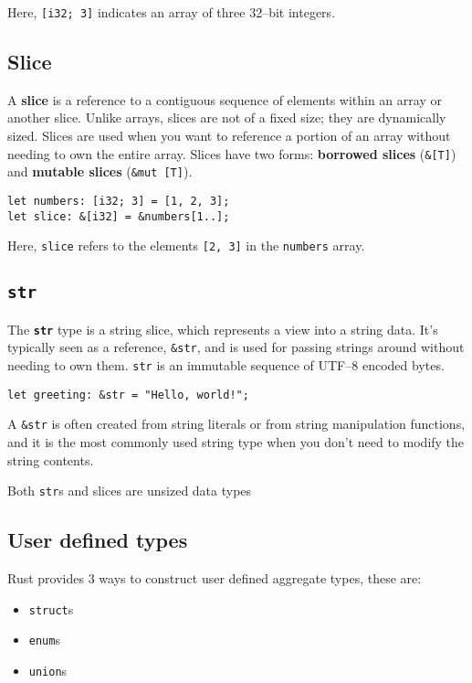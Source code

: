 Here, \texttt{[i32; 3]} indicates an array of three 32--bit integers.

\subsection{Slice}
A \textbf{slice} is a reference to a contiguous sequence of elements within an array or another slice. Unlike arrays, slices are not of a fixed size; they are dynamically sized.
Slices are used when you want to reference a portion of an array without needing to own the entire array. Slices have two forms: \textbf{borrowed slices} (\texttt{\&[T]}) and \textbf{mutable slices} (\texttt{\&mut [T]}).

\begin{lstlisting}
let numbers: [i32; 3] = [1, 2, 3];
let slice: &[i32] = &numbers[1..];
\end{lstlisting}

Here, \texttt{slice} refers to the elements \texttt{[2, 3]} in the \texttt{numbers} array.

\subsection{\texttt{str}}
The \textbf{\texttt{str}} type is a string slice, which represents a view into a string data. It's typically seen as a reference, 
\texttt{\&str}, and is used for passing strings around without needing to own them. \texttt{str} is an immutable sequence of UTF--8 encoded bytes.

\begin{lstlisting}
let greeting: &str = "Hello, world!";
\end{lstlisting}

A \texttt{\&str} is often created from string literals or from string manipulation functions, and it is the most commonly used string type when you don't need to modify the string contents.

Both \texttt{str}s and slices are unsized data types 

\subsection{User defined types}

Rust provides 3 ways to construct user defined aggregate types, these are:
\begin{itemize}
    \item \texttt{struct}s
    \item \texttt{enum}s
    \item \texttt{union}s
\end{itemize}

